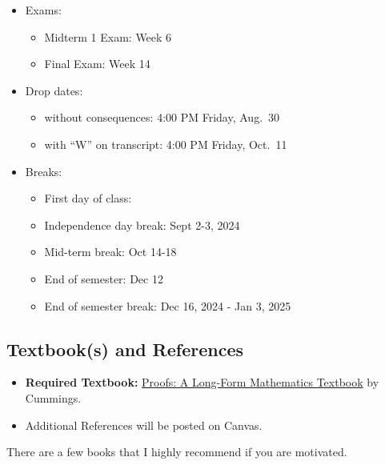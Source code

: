 \documentclass[
]{article}
\providecommand{\tightlist}{%
  \setlength{\itemsep}{0pt}\setlength{\parskip}{0pt}}
\begin{document}
\begin{itemize}
\tightlist
\item
  Exams:

  \begin{itemize}
  \tightlist
  \item
    Midterm 1 Exam: Week 6
  \item
    Final Exam: Week 14
  \end{itemize}
\item
  Drop dates:

  \begin{itemize}
  \tightlist
  \item
    without consequences: 4:00 PM Friday, Aug.~30
  \item
    with ``W'' on transcript: 4:00 PM Friday, Oct.~11
  \end{itemize}
\item
  Breaks:

  \begin{itemize}
  \tightlist
  \item
    First day of class:
  \item
    Independence day break: Sept 2-3, 2024
  \item
    Mid-term break: Oct 14-18
  \item
    End of semester: Dec 12
  \item
    End of semester break: Dec 16, 2024 - Jan 3, 2025
  \end{itemize}
\end{itemize}

\subsection*{Textbook(s) and References}\label{textbooks-and-references}

\begin{itemize}
\item
  \textbf{Required Textbook:} \href{https://longformmath.com/proofs-home}{Proofs: A Long-Form Mathematics Textbook} by Cummings.
\item
  Additional References will be posted on Canvas.
\end{itemize}

There are a few books that I highly recommend if you are motivated.
\end{document}
